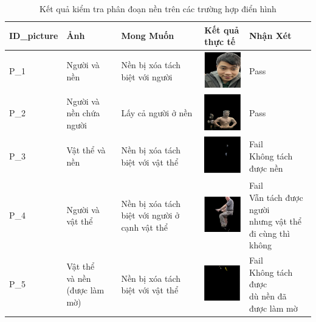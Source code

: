 \documentclass[12pt]{report}
\begin{document}
\begin{table}[h!]
\centering
\renewcommand{\arraystretch}{1.4}
\setlength{\tabcolsep}{2.5pt}
\begin{tabularx}{\textwidth}{|
    >{\centering\arraybackslash}p{1.1cm}|
    >{\centering\arraybackslash}p{2.2cm}|
    >{\centering\arraybackslash}p{3.3cm}|
    >{\centering\arraybackslash}p{2.2cm}|
    >{\centering\arraybackslash}X|}
\hline
\textbf{ID\_picture} & \textbf{Ảnh} & \textbf{Mong Muốn} & \textbf{Kết quả thực tế} & \textbf{Nhận Xét} \\
\hline
P\_1 & Người và nền &
Nền bị xóa tách biệt với người &
\includegraphics[width=1.7cm]{p1_result.png} &
Pass \\
\hline
P\_2 & Người và nền chứa người &
Lấy cả người ở nền &
\includegraphics[width=1.7cm]{p2_result.png} &
Pass \\
\hline
P\_3 & Vật thể và nền &
Nền bị xóa tách biệt với vật thể &
\includegraphics[width=1.7cm]{p3_result.png} &
\makecell{Fail\\Không tách được nền} \\
\hline
P\_4 & Người và vật thể &
Nền bị xóa tách biệt với người ở cạnh vật thể &
\includegraphics[width=1.7cm]{p4_result.png} &
\makecell{Fail\\Vẫn tách được người\\nhưng vật thể đi cùng thì không} \\
\hline
P\_5 & \makecell{Vật thể\\và nền\\(được làm mờ)} &
Nền bị xóa tách biệt với vật thể &
\includegraphics[width=1.7cm]{p5_result.png} &
\makecell{Fail\\Không tách được\\dù nền đã được làm mờ} \\
\hline
\end{tabularx}
\caption{Kết quả kiểm tra phân đoạn nền trên các trường hợp điển hình}
\end{table}
\end{document}
